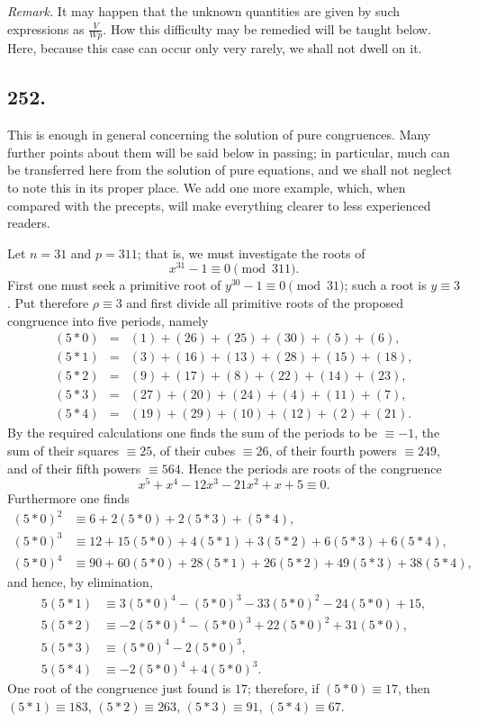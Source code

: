\documentclass[12pt]{article}
\begin{document}
\textit{Remark.} It may happen that the unknown quantities are given by such expressions as $\frac{V}{Wp}$. How this difficulty may be remedied will be taught below. Here, because this case can occur only very rarely, we shall not dwell on it.

\subsection*{252.}
This is enough in general concerning the solution of pure congruences. Many further points about them will be said below in passing; in particular, much can be transferred here from the solution of pure equations, and we shall not neglect to note this in its proper place. We add one more example, which, when compared with the precepts, will make everything clearer to less experienced readers.

Let $n=31$ and $p=311$; that is, we must investigate the roots of
\[
x^{31}-1\equiv 0\pmod {311}.
\]
First one must seek a primitive root of $y^{30}-1\equiv 0\pmod {31}$; such a root is $y\equiv 3$. Put therefore $\rho\equiv 3$ and first divide all primitive roots of the proposed congruence into five periods, namely
\[
\begin{array}{rcl}
(5*0)&=&(1)+(26)+(25)+(30)+(5)+(6),\\
(5*1)&=&(3)+(16)+(13)+(28)+(15)+(18),\\
(5*2)&=&(9)+(17)+(8)+(22)+(14)+(23),\\
(5*3)&=&(27)+(20)+(24)+(4)+(11)+(7),\\
(5*4)&=&(19)+(29)+(10)+(12)+(2)+(21).
\end{array}
\]
By the required calculations one finds the sum of the periods to be $\equiv -1$, the sum of their squares $\equiv 25$, of their cubes $\equiv 26$, of their fourth powers $\equiv 249$, and of their fifth powers $\equiv 564$. Hence the periods are roots of the congruence
\[
x^5+x^4-12x^3-21x^2+x+5\equiv 0.
\]
Furthermore one finds
\[
\begin{aligned}
(5*0)^2&\equiv 6+2(5*0)+2(5*3)+(5*4),\\
(5*0)^3&\equiv 12+15(5*0)+4(5*1)+3(5*2)+6(5*3)+6(5*4),\\
(5*0)^4&\equiv 90+60(5*0)+28(5*1)+26(5*2)+49(5*3)+38(5*4),
\end{aligned}
\]
and hence, by elimination,
\[
\begin{aligned}
5(5*1)&\equiv 3(5*0)^4-(5*0)^3-33(5*0)^2-24(5*0)+15,\\
5(5*2)&\equiv -2(5*0)^4-(5*0)^3+22(5*0)^2+31(5*0),\\
5(5*3)&\equiv (5*0)^4-2(5*0)^3,\\
5(5*4)&\equiv -2(5*0)^4+4(5*0)^3.
\end{aligned}
\]
One root of the congruence just found is $17$; therefore, if $(5*0)\equiv 17$, then $(5*1)\equiv 183$, $(5*2)\equiv 263$, $(5*3)\equiv 91$, $(5*4)\equiv 67$.
\end{document}
